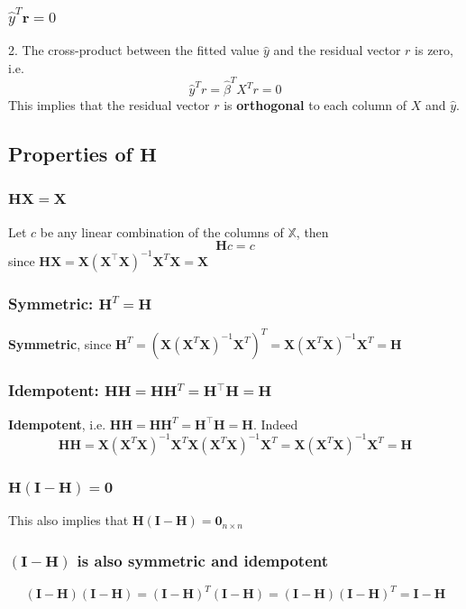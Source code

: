 \documentclass[11pt,a4paper]{article}
\begin{document}
\subsubsection{$\hat{y}^{T} \boldsymbol{r}=0$}
2. The cross-product between the fitted value $\hat{y}$ and the residual vector $r$ is zero, i.e.
$$
\hat{y}^{T} r=\hat{\beta}^{T} X^{T} r=0
$$
This implies that the residual vector $r$ is \textbf{orthogonal} to each column of $X$ and $\hat{y}$.\\
\subsection{Properties of $\mathbf{H}$}
\subsubsection{$\mathbf{H X}=\mathbf{X}$}
Let $c$ be any linear combination of the columns of $\mathbb{X}$, then
$$
\mathbf{H} c=c
$$
since $\mathbf{H X}=\mathbf{X}\left(\mathbf{X}^{\top} \mathbf{X}\right)^{-1} \mathbf{X}^{T} \mathbf{X}=\mathbf{X}$
\subsubsection{Symmetric: $\mathbf{H}^{T}=\mathbf{H}$}
\textbf{Symmetric}, since $\mathbf{H}^{T}=\left(\mathbf{X}\left(\mathbf{X}^{T} \mathbf{X}\right)^{-1} \mathbf{X}^{T}\right)^{T}=\mathbf{X}\left(\mathbf{X}^{T} \mathbf{X}\right)^{-1} \mathbf{X}^{T}=\mathbf{H}$
\subsubsection{Idempotent: $\mathbf{H H}=\mathbf{H H}^{T}=\mathbf{H}^{\top} \mathbf{H}=\mathbf{H}$}
\textbf{Idempotent}, i.e. $\mathbf{H H}=\mathbf{H H}^{T}=\mathbf{H}^{\top} \mathbf{H}=\mathbf{H} .$ Indeed
$$
\mathbf{H H}=\mathbf{X}\left(\mathbf{X}^{T} \mathbf{X}\right)^{-1} \mathbf{X}^{T} \mathbf{X}\left(\mathbf{X}^{T} \mathbf{X}\right)^{-1} \mathbf{X}^{T}=\mathbf{X}\left(\mathbf{X}^{T} \mathbf{X}\right)^{-1} \mathbf{X}^{T}=\mathbf{H}
$$
\subsubsection{$\mathbf{H}(\mathbf{I}-\mathbf{H})=\mathbf{0}$}
This also implies that $\mathbf{H}(\mathbf{I}-\mathbf{H})=\mathbf{0}_{n \times n}$
\subsubsection{$(\mathbf{I}-\mathbf{H})$ is also symmetric and idempotent}
$$(\mathbf{I}-\mathbf{H})(\mathbf{I}-\mathbf{H})=(\mathbf{I}-\mathbf{H})^T(\mathbf{I}-\mathbf{H})=(\mathbf{I}-\mathbf{H})(\mathbf{I}-\mathbf{H})^T=\mathbf{I}-\mathbf{H}$$
\end{document}

